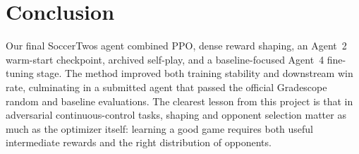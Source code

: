 \documentclass{article}
\begin{document}
\section{Conclusion}
Our final SoccerTwos agent combined PPO, dense reward shaping, an Agent~2 warm-start checkpoint, archived self-play, and a baseline-focused Agent~4 fine-tuning stage. The method improved both training stability and downstream win rate, culminating in a submitted agent that passed the official Gradescope random and baseline evaluations. The clearest lesson from this project is that in adversarial continuous-control tasks, shaping and opponent selection matter as much as the optimizer itself: learning a good game requires both useful intermediate rewards and the right distribution of opponents.

\clearpage
{}


\end{document}
